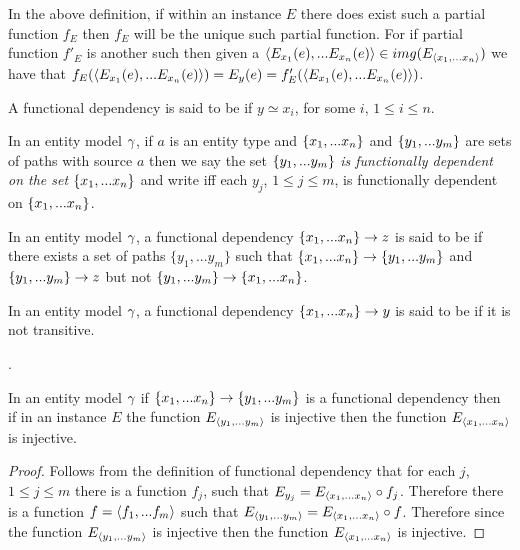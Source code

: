 \begin{remark}
In the above definition, if within an instance $E$ there does exist such a partial function $f_E$ then $f_E$ will be the unique such partial function. For if partial function $f'_E$ is another such then given a $\langle E_{x_1}(e),...E_{x_n}(e)\rangle \in img(E_{\langle x_1,...x_n\rangle})$
we have that $f_E(\langle E_{x_1}(e),...E_{x_n}(e)\rangle)=E_y(e)=f'_E(\langle E_{x_1}(e),...E_{x_n}(e)\rangle)$.
\end{remark}

\begin{definition}
A functional dependency  is said to be  if $y\simeq x_i$, for some $i$, $1 \leq i \leq n$.
\end{definition}

\begin{definition}
In an entity model $\gamma$, if
$a$ is an entity type and $\left\{x_1,...x_n\right\}$ and $\left\{y_1,...y_m\right\}$ are sets of paths with source $a$
then we say the set $\left\{y_1,...y_m\right\}$ \textit{is functionally dependent on the set} $\left\{x_1,...x_n\right\}$ and write
iff  each $y_j$, $1 \leq j \leq m$, is functionally dependent on $\left\{x_1,...x_n\right\}$.
\end{definition}
\begin{definition} %
In an entity model $\gamma$, a functional dependency $\left\{x_1,...x_n\right\} \rightarrow z$
is said to be  if there exists a set of paths $\{y_1,...y_{m}\}$ such that
$\left\{x_1,...x_n\right\} \rightarrow \left\{y_1,...y_{m}\right\}$ and $\left\{y_1,...y_{m}\right\} \rightarrow z$ but not
$\{y_1,...y_{m}\} \rightarrow \{x_1,...x_n\}$.
\end{definition}
\begin{definition} %
In an entity model $\gamma$, a functional dependency $\left\{x_1,...x_n\right\} \rightarrow y$
is said to be  if it is not transitive.
\end{definition} .
\begin{lemma}
\label{transitiveinjectivelemma}
In an entity model $\gamma$ if $\left\{x_1,...x_n\right\} \rightarrow \left\{y_1,...y_{m}\right\}$ is a functional dependency then if in an instance $E$ the function $E_{\langle y_1,...y_{m}\rangle}$ is injective then the function $E_{\langle x_1,...x_n\rangle}$  is injective.
\end{lemma}
\begin{proof}
Follows from the definition of functional dependency that for each $j$, $1 \leq j \leq m$  there is a function ${f_j}$,  such that
$E_{y_j}=E_{\langle x_1,...x_n\rangle}\circ f_j$. Therefore there is a function $f=\langle f_1,...f_m\rangle$ such that
$E_{\langle y_1,...y_m\rangle}= E_{\langle x_1,...x_n\rangle}\circ f $. Therefore since  the function $E_{\langle y_1,...y_{m}\rangle}$ is 
injective then the function $E_{\langle x_1,...x_n\rangle}$  is injective.
\end{proof}

